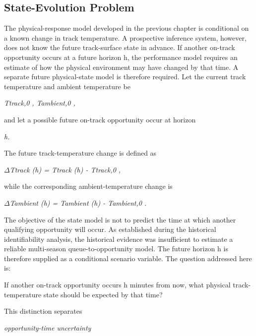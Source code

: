 \subsection{State-Evolution Problem}
The physical-response model developed in the previous chapter is conditional on a known change in track temperature. A prospective inference system, however, does not know the future track-surface state in advance. If another on-track opportunity occurs at a future horizon h, the performance model requires an estimate of how the physical environment may have changed by that time. A separate future physical-state model is therefore required. Let the current track temperature and ambient temperature be

\begin{center}\textit{Ttrack,0 ,        Tambient,0 ,}\end{center}

and let a possible future on-track opportunity occur at horizon

\begin{center}\textit{h.}\end{center}

The future track-temperature change is defined as

\begin{center}\textit{\ensuremath{\Delta}Ttrack (h) = Ttrack (h) - Ttrack,0 ,}\end{center}

while the corresponding ambient-temperature change is

\begin{center}\textit{\ensuremath{\Delta}Tambient (h) = Tambient (h) - Tambient,0 .}\end{center}

The objective of the state model is not to predict the time at which another qualifying opportunity will occur. As established during the historical identifiability analysis, the historical evidence was insufficient to estimate a reliable multi-season queue-to-opportunity model. The future horizon h is therefore supplied as a conditional scenario variable. The question addressed here is:

If another on-track opportunity occurs h minutes from now, what physical track-temperature state should be expected by that time?

This distinction separates

\begin{center}\textit{opportunity-time uncertainty}\end{center}

